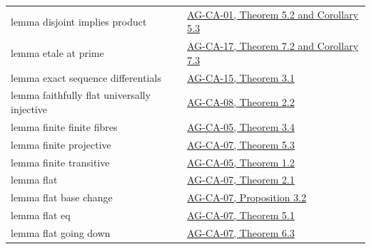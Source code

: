 \documentclass[11pt,a4paper,openany]{report}
\begin{document}
{\begin{longtable}[]{@{}
  >{\raggedright\arraybackslash}p{}
  >{\raggedright\arraybackslash}p{}@{}}
lemma disjoint implies product & \href{https://github.com/KokunoYumeto/open-math-courses/blob/d02d0a3669f42579db037cd44de1d113fdd770a1/docs/courses/AG-CA/src/spectra-of-rings.md}{AG-CA-01, Theorem 5.2 and Corollary 5.3} \\
lemma etale at prime & \href{https://github.com/KokunoYumeto/open-math-courses/blob/d02d0a3669f42579db037cd44de1d113fdd770a1/docs/courses/AG-CA/src/formally-smooth-unramified-and-etale-ring-maps.md}{AG-CA-17, Theorem 7.2 and Corollary 7.3} \\
lemma exact sequence differentials & \href{https://github.com/KokunoYumeto/open-math-courses/blob/d02d0a3669f42579db037cd44de1d113fdd770a1/docs/courses/AG-CA/src/kahler-differentials.md}{AG-CA-15, Theorem 3.1} \\
lemma faithfully flat universally injective & \href{https://github.com/KokunoYumeto/open-math-courses/blob/d02d0a3669f42579db037cd44de1d113fdd770a1/docs/courses/AG-CA/src/faithful-flatness-and-the-local-criterion-for-flatness.md}{AG-CA-08, Theorem 2.2} \\
lemma finite finite fibres & \href{https://github.com/KokunoYumeto/open-math-courses/blob/d02d0a3669f42579db037cd44de1d113fdd770a1/docs/courses/AG-CA/src/integral-extensions-lying-over-going-up-and-going-down.md}{AG-CA-05, Theorem 3.4} \\
lemma finite projective & \href{https://github.com/KokunoYumeto/open-math-courses/blob/d02d0a3669f42579db037cd44de1d113fdd770a1/docs/courses/AG-CA/src/tor-and-flat-modules.md}{AG-CA-07, Theorem 5.3} \\
lemma finite transitive & \href{https://github.com/KokunoYumeto/open-math-courses/blob/d02d0a3669f42579db037cd44de1d113fdd770a1/docs/courses/AG-CA/src/integral-extensions-lying-over-going-up-and-going-down.md}{AG-CA-05, Theorem 1.2} \\
lemma flat & \href{https://github.com/KokunoYumeto/open-math-courses/blob/d02d0a3669f42579db037cd44de1d113fdd770a1/docs/courses/AG-CA/src/tor-and-flat-modules.md}{AG-CA-07, Theorem 2.1} \\
lemma flat base change & \href{https://github.com/KokunoYumeto/open-math-courses/blob/d02d0a3669f42579db037cd44de1d113fdd770a1/docs/courses/AG-CA/src/tor-and-flat-modules.md}{AG-CA-07, Proposition 3.2} \\
lemma flat eq & \href{https://github.com/KokunoYumeto/open-math-courses/blob/d02d0a3669f42579db037cd44de1d113fdd770a1/docs/courses/AG-CA/src/tor-and-flat-modules.md}{AG-CA-07, Theorem 5.1} \\
lemma flat going down & \href{https://github.com/KokunoYumeto/open-math-courses/blob/d02d0a3669f42579db037cd44de1d113fdd770a1/docs/courses/AG-CA/src/tor-and-flat-modules.md}{AG-CA-07, Theorem 6.3} \\

\end{longtable}}
\end{document}
